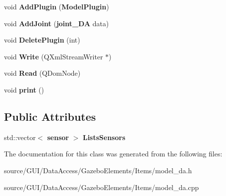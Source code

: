 \begin{DoxyCompactItemize}
\item 
void {\bfseries Add\+Plugin} ({\bf Model\+Plugin})\label{class_model___d_a_a213b874605ebbb967ef88cfa35fccadd}

\item 
void {\bfseries Add\+Joint} ({\bf joint\+\_\+\+DA} data)\label{class_model___d_a_a17f359e54b4e3006bdd77be7dad4518b}

\item 
void {\bfseries Delete\+Plugin} (int)\label{class_model___d_a_ab944e193cd1a01bf9e5c1df974ce2370}

\item 
void {\bfseries Write} (Q\+Xml\+Stream\+Writer $\ast$)\label{class_model___d_a_acfa7026bc6c165c6c18e0b46074a7b70}

\item 
void {\bfseries Read} (Q\+Dom\+Node)\label{class_model___d_a_ac8bcecf893cacb311f21eecca535de2f}

\item 
void {\bfseries print} ()\label{class_model___d_a_aed70f3771526d3a734c3fbb1bbf2784d}

\end{DoxyCompactItemize}
\subsection*{Public Attributes}
\begin{DoxyCompactItemize}
\item 
std\+::vector$<$ {\bf sensor} $>$ {\bfseries Lists\+Sensors}\label{class_model___d_a_a0a64551dd8ce7674c4a3704a0f7d9644}

\end{DoxyCompactItemize}


The documentation for this class was generated from the following files\+:\begin{DoxyCompactItemize}
\item 
source/\+G\+U\+I/\+Data\+Access/\+Gazebo\+Elements/\+Items/model\+\_\+da.\+h\item 
source/\+G\+U\+I/\+Data\+Access/\+Gazebo\+Elements/\+Items/model\+\_\+da.\+cpp\end{DoxyCompactItemize}
